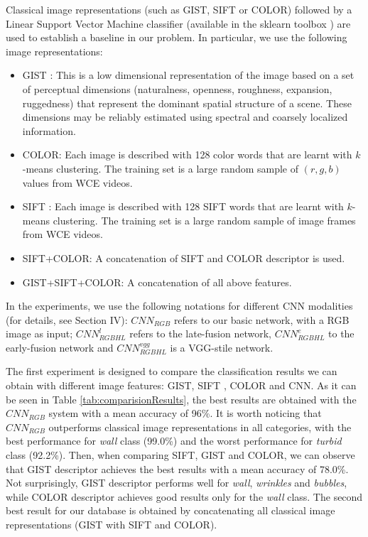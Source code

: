 \documentclass[review,12pt,3p]{elsarticle}
\begin{document}
Classical image representations (such as GIST, SIFT or COLOR) followed by a Linear Support Vector Machine classifier (available in the sklearn toolbox \cite{scikit-learn}) are used to establish a baseline in our problem. In particular, we use the following image representations:
\begin{itemize}
\item GIST \cite{oliva2001modeling}:  This is a low dimensional representation of the image based on a set of perceptual dimensions (naturalness, openness, roughness, expansion, ruggedness) that
represent the dominant spatial structure of a scene. These dimensions may be reliably estimated using spectral and coarsely localized information.
\item COLOR: Each image is described with 128 color words that are learnt with $k$-means clustering. The training set is a large random sample of $(r,g,b)$ values from WCE videos.
\item SIFT \cite{Lowe_sift}: Each image is described with 128 SIFT words that are learnt with $k$-means clustering. The training set is a large random sample of image frames from WCE videos.
\item SIFT+COLOR: A concatenation of SIFT and COLOR descriptor is used.
\item GIST+SIFT+COLOR: A concatenation of all above features.
\end{itemize}

In the experiments, we use the following notations for different CNN modalities (for details, see Section IV): $CNN_{RGB}$ refers to our basic network, with a RGB image as input; $CNN^l_{RGBHL}$ refers to the late-fusion network, $CNN^e_{RGBHL}$ to the early-fusion network and $CNN^{vgg}_{RGBHL}$ is a VGG-stile network.

The first experiment is designed to compare the classification results we can obtain with different image features: GIST, SIFT , COLOR and CNN.  As it can be seen in Table \ref{tab:comparisionResults}, the best results are obtained with the $CNN_{RGB}$ system with a mean accuracy of 96\%. It is worth noticing that $CNN_{RGB}$ outperforms classical image representations in all categories, with the best performance for \emph{wall} class (99.0\%) and the worst performance for \emph{turbid} class (92.2\%). Then, when comparing SIFT, GIST and COLOR, we can observe that GIST descriptor achieves the best results with a mean accuracy of 78.0\%. Not surprisingly, GIST descriptor performs well for \emph{wall}, \emph{wrinkles} and \emph{bubbles}, while COLOR descriptor achieves good results only for the \emph{wall} class. The second best result for our database is obtained by concatenating all classical image representations (GIST with SIFT and COLOR).
\end{document}
